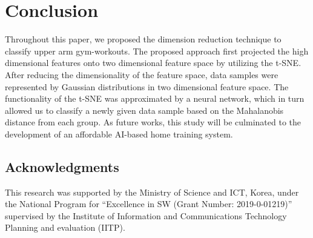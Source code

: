 \documentclass{ISIS}
\begin{document}
\section{Conclusion}
%
Throughout this paper, we proposed the dimension reduction technique to classify upper arm gym-workouts. The proposed approach first projected the high dimensional features onto two dimensional feature space by utilizing the t-SNE. After reducing the dimensionality of the feature space, data samples were represented by Gaussian distributions in two dimensional feature space. The functionality of the t-SNE was approximated by a neural network, which in turn allowed us to classify a newly given data sample based on the Mahalanobis distance from each group. As future works, this study will be culminated to the development of an affordable AI-based home training system. 


\subsection*{Acknowledgments}
This research was supported by the Ministry of Science and ICT, Korea, under the National
Program for ``Excellence in SW (Grant Number: 2019-0-01219)'' supervised by the Institute of
Information and Communications Technology Planning and evaluation (IITP).
\end{document}
